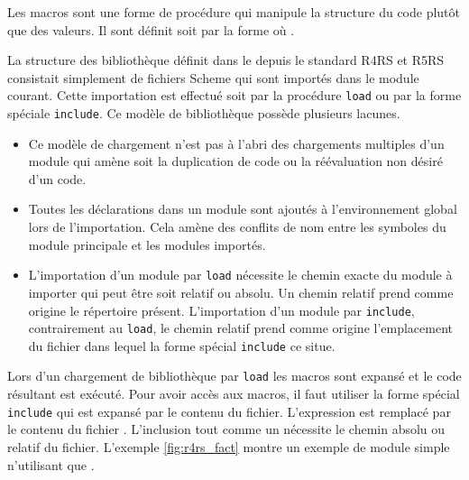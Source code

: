 Les macros sont une forme de procédure qui manipule la structure du code
plutôt que des valeurs. Il sont définit soit par la forme 
où .


La structure des bibliothèque définit dans le depuis le standard
R4RS\cite{Scheme:R4RS} et R5RS\cite{Scheme:R5RS} consistait simplement de
fichiers Scheme qui sont importés dans le module courant. Cette importation est
effectué soit par la procédure \texttt{load} ou par la forme spéciale
\texttt{include}. Ce modèle de bibliothèque possède plusieurs lacunes.

\begin{itemize}
  \item Ce modèle de chargement n'est pas à l'abri des chargements multiples
    d'un module qui amène soit la duplication de code ou la réévaluation
    non désiré d'un code.

  \item Toutes les déclarations dans un module sont ajoutés à l'environnement
    global lors de l'importation. Cela amène des conflits de nom entre les
    symboles du module principale et les modules importés.

  \item L'importation d'un module par \texttt{load} nécessite le chemin exacte
    du module à importer qui peut être soit relatif ou absolu.  Un chemin
    relatif prend comme origine le répertoire présent.  L'importation d'un
    module par \texttt{include}, contrairement au \texttt{load}, le chemin
    relatif prend comme origine l'emplacement du fichier dans lequel la forme
    spécial \texttt{include} ce situe.

\end{itemize}


Lors d'un chargement de bibliothèque par \texttt{load} les macros sont expansé
et le code résultant est exécuté. Pour avoir accès aux macros, il faut utiliser la
forme spécial \texttt{include} qui est expansé par le contenu du fichier.
L'expression  est remplacé par le contenu du fichier
. L'inclusion tout comme un  nécessite le chemin
absolu ou relatif du fichier. L'exemple \ref{fig:r4rs_fact} montre un exemple
de module simple n'utilisant que .

